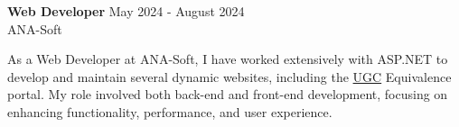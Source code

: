 \documentclass{resume} %
\begin{document}
 
     


 
\textbf{Web Developer} \hfill May 2024 - August 2024\\
ANA-Soft 

As a Web Developer at ANA-Soft, I have worked extensively with ASP.NET to develop and maintain several dynamic websites, including the \href{https://ugc-equivalence.website-link.info/Login.aspx}{UGC} Equivalence portal. My role involved both back-end and front-end development, focusing on enhancing functionality, performance, and user experience. 



\end{document}

